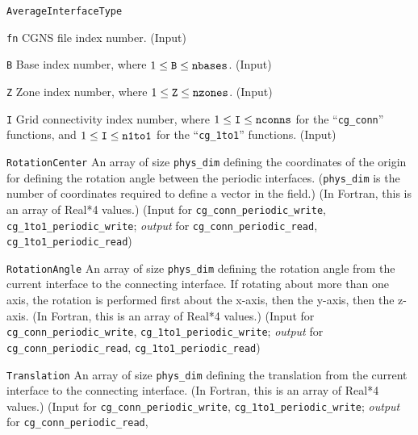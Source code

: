 \begin{Ventryi}{\texttt{AverageInterfaceType}}\raggedright
\item [\texttt{fn}]
      CGNS file index number.
      (\textcolor{input}{Input})
\item [\texttt{B}]
      Base index number, where $1 \leq \text{\texttt{B}} \leq \text{\texttt{nbases}}$.
      (\textcolor{input}{Input})
\item [\texttt{Z}]
      Zone index number, where $1 \leq \text{\texttt{Z}} \leq \text{\texttt{nzones}}$.
      (\textcolor{input}{Input})
\item [\texttt{I}]
      Grid connectivity index number, where
      $1 \leq \text{\texttt{I}} \leq \text{\texttt{nconns}}$
      for the ``\texttt{cg\_conn}'' functions, and
      $1 \leq \text{\texttt{I}} \leq \text{\texttt{n1to1}}$
      for the ``\texttt{cg\_1to1}'' functions.
      (\textcolor{input}{Input})
\item [\texttt{RotationCenter}]
      An array of size \texttt{phys\_dim} defining the coordinates of
      the origin for defining the rotation angle between the periodic
      interfaces.
      (\texttt{phys\_dim} is the number of coordinates required to define
      a vector in the field.)
      (In Fortran, this is an array of Real*4 values.)
      (\textcolor{input}{Input} for \texttt{cg\_conn\_periodic\_write},
      \texttt{cg\_1to1\_periodic\_write};
      \textcolor{output}{\textit{output}} for \texttt{cg\_conn\_periodic\_read},
      \texttt{cg\_1to1\_periodic\_read})
\item [\texttt{RotationAngle}]
      An array of size \texttt{phys\_dim} defining the rotation angle from
      the current interface to the connecting interface.
      If rotating about more than one axis, the rotation is performed
      first about the x-axis, then the y-axis, then the z-axis.
      (In Fortran, this is an array of Real*4 values.)
      (\textcolor{input}{Input} for \texttt{cg\_conn\_periodic\_write},
      \texttt{cg\_1to1\_periodic\_write};
      \textcolor{output}{\textit{output}} for \texttt{cg\_conn\_periodic\_read},
      \texttt{cg\_1to1\_periodic\_read})
\item [\texttt{Translation}]
      An array of size \texttt{phys\_dim} defining the translation from
      the current interface to the connecting interface.
      (In Fortran, this is an array of Real*4 values.)
      (\textcolor{input}{Input} for \texttt{cg\_conn\_periodic\_write},
      \texttt{cg\_1to1\_periodic\_write};
      \textcolor{output}{\textit{output}} for \texttt{cg\_conn\_periodic\_read},

\end{Ventryi}
